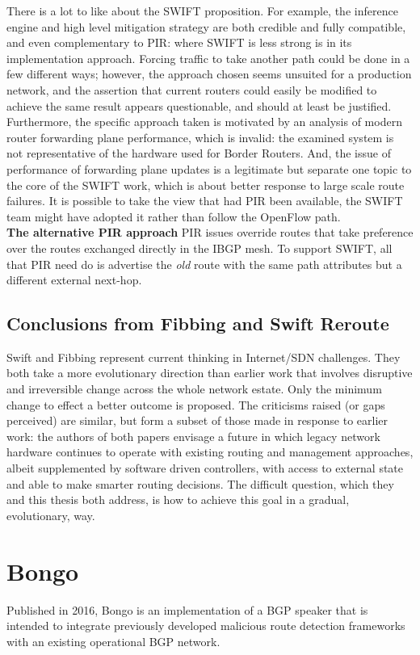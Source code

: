 There is a lot to like about the SWIFT proposition. For example, the inference engine and high level mitigation strategy are both credible and fully compatible, and even complementary to PIR:
where SWIFT is less strong is in its implementation approach.
Forcing traffic to take another path could be done in a few different ways; however, the approach chosen seems unsuited for a production network,
and the assertion that current routers could easily be modified to achieve the same result appears questionable, and should at least be justified.
Furthermore, the specific approach taken is motivated by an analysis of modern router forwarding plane performance, which is invalid: the examined system is not representative of the hardware used for Border Routers.
And, the issue of performance of forwarding plane updates is a legitimate but separate one topic to the core of the SWIFT work, which is about better response to large scale route failures.
It is possible to take the view that had PIR been available, the SWIFT team might have adopted it rather than follow the OpenFlow path.
\\
\textbf{The alternative PIR approach}   PIR issues override routes that take preference over the routes exchanged directly in the IBGP mesh.  To support SWIFT, all that PIR need do is advertise the \emph{old} route with the same path attributes but a different external next-hop.

\subsection{Conclusions from Fibbing and Swift Reroute}
Swift and Fibbing represent current thinking in Internet/SDN challenges.
They both take a more evolutionary direction than earlier work that involves disruptive and irreversible change across the whole network estate.
Only the minimum change to effect a better outcome is proposed.
The criticisms raised (or gaps perceived) are similar, but form a subset of those made in response to earlier work: the authors of both papers envisage a future in which legacy network hardware continues to operate with existing routing and management approaches, albeit supplemented by software driven controllers, with access to external state and able to make smarter routing decisions.
The difficult question, which they and this thesis both address, is how to achieve this goal in a gradual, evolutionary, way.


\section{Bongo}
Published in 2016, Bongo \cite{Benton2016} is an implementation of a BGP speaker that is intended to integrate previously developed malicious route detection frameworks with an existing operational BGP network.


